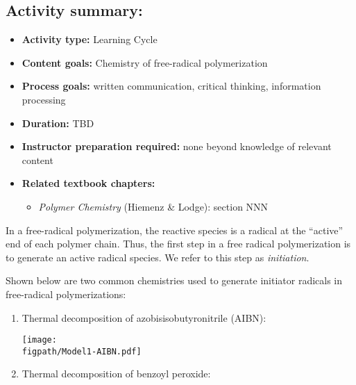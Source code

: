 \begin{activity}
\begin{instructornotes}
	\subsection*{Activity summary:}
	\begin{itemize}
		\item \textbf{Activity type:} Learning Cycle
		\item \textbf{Content goals:} Chemistry of free-radical polymerization
		\item \textbf{Process goals:} %
			written communication, critical thinking, information processing
		\item \textbf{Duration:} TBD
		\item \textbf{Instructor preparation required:} none beyond knowledge of relevant content
		\item \textbf{Related textbook chapters:}
			\begin{itemize}
				\item \emph{Polymer Chemistry} (Hiemenz \& Lodge): section NNN
			\end{itemize}
	\end{itemize}
	
\end{instructornotes}


\begin{model}[Initiation]
	\label{\labelbase:mdl:FRPinitchem}

	In a free-radical polymerization, the reactive species is a radical at the ``active'' end of each polymer chain.  Thus, the first step in a free radical polymerization is to generate an active radical species.  We refer to this step as \emph{initiation}.
	
	Shown below are two common chemistries used to generate initiator radicals in free-radical polymerizations:
	
	\begin{enumerate}
		\item Thermal decomposition of azobisisobutyronitrile (AIBN):
	
			\centerline{\texttt{[image: \\figpath/Model1-AIBN.pdf]}}
			
		\item Thermal decomposition of benzoyl peroxide:
	

\end{enumerate}
\end{model}
\end{activity}

